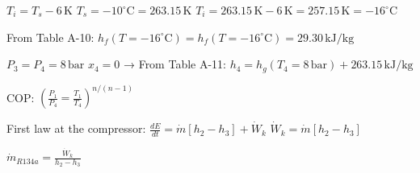 \( T_i = T_s - 6 \, \text{K} \)  
\( T_s = -10^\circ \text{C} = 263.15 \, \text{K} \)  
\( T_i = 263.15 \, \text{K} - 6 \, \text{K} = 257.15 \, \text{K} = -16^\circ \text{C} \)  

From Table A-10:  
\( h_f (T = -16^\circ \text{C}) = h_f (T = -16^\circ \text{C}) = 29.30 \, \text{kJ/kg} \)  

\( P_3 = P_4 = 8 \, \text{bar} \)  
\( x_4 = 0 \) → From Table A-11:  
\( h_4 = h_g (T_4 = 8 \, \text{bar}) + 263.15 \, \text{kJ/kg} \)  

COP:  
\( \left( \frac{P_1}{P_4} = \frac{T_1}{T_4} \right)^{n/(n-1)} \)  

First law at the compressor:  
\( \frac{dE}{dt} = \dot{m} \left[ h_2 - h_3 \right] + \dot{W}_k \)  
\( \dot{W}_k = \dot{m} \left[ h_2 - h_3 \right] \)  

\( \dot{m}_{R134a} = \frac{\dot{W}_k}{h_2 - h_3} \)